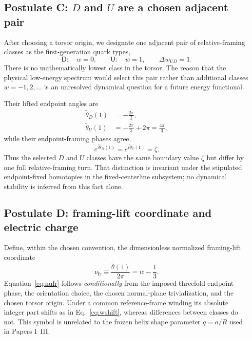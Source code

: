 \documentclass[aps,prd,reprint,superscriptaddress,nofootinbib,longbibliography,floatfix]{revtex4-2}
\newcommand{\Ustate}{\mathsf{U}}
\newcommand{\Dstate}{\mathsf{D}}
\newcommand{\nufr}{\nu_{\mathrm{fr}}}
\begin{document}
\subsection{Postulate C: $D$ and $U$ are a chosen adjacent pair}

After choosing a torsor origin, we designate one adjacent pair of relative-framing classes as the first-generation quark types,
\begin{equation}
\Dstate:\quad w=0,
\qquad
\Ustate:\quad w=1,
\qquad
\Delta w_{UD}=1.
\label{eq:UDclasses}
\end{equation}
There is no mathematically lowest class in the torsor. The reason that the physical low-energy spectrum would select this pair rather than additional classes $w=-1,2,\ldots$ is an unresolved dynamical question for a future energy functional.

Their lifted endpoint angles are
\begin{align}
\widetilde\theta_D(1)&=-\frac{2\pi}{3},
\label{eq:Dangle}\\
\widetilde\theta_U(1)&=-\frac{2\pi}{3}+2\pi
=\frac{4\pi}{3},
\label{eq:Uangle}
\end{align}
while their endpoint-framing phases agree,
\begin{equation}
e^{i\widetilde\theta_D(1)}
=e^{i\widetilde\theta_U(1)}
=\zeta.
\label{eq:sameendpointphase}
\end{equation}
Thus the selected $D$ and $U$ classes have the same boundary value $\zeta$ but differ by one full relative-framing turn. That distinction is invariant under the stipulated endpoint-fixed homotopies in the fixed-centerline subsystem; no dynamical stability is inferred from this fact alone.

\subsection{Postulate D: framing-lift coordinate and electric charge}

Define, within the chosen convention, the dimensionless normalized framing-lift coordinate
\begin{equation}
\nufr
\equiv
\frac{\widetilde\theta(1)}{2\pi}
=w-\frac13.
\label{eq:nufr}
\end{equation}
Equation~\eqref{eq:nufr} follows \emph{conditionally} from the imposed threefold endpoint phase, the orientation choice, the chosen normal-plane trivialization, and the chosen torsor origin. Under a common reference-frame winding its absolute integer part shifts as in Eq.~\eqref{eq:wshift}, whereas differences between classes do not. This symbol is unrelated to the frozen helix shape parameter $q=a/R$ used in Papers I--III.
\end{document}
